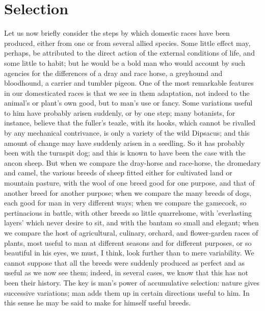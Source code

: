 \section{Selection}
\indent Let us now briefly consider the steps by which domestic races have been produced, either from one or from several allied species. Some little effect may, perhaps, be attributed to the direct action of the external conditions of life, and some little to habit; but he would be a bold man who would account by such agencies for the differences of a dray and race horse, a greyhound and bloodhound, a carrier and tumbler pigeon. One of the most remarkable features in our domesticated races is that we see in them adaptation, not indeed to the animal's or plant's own good, but to man's use or fancy. Some variations useful to him have probably arisen suddenly, or by one step; many botanists, for instance, believe that the fuller's teazle, with its hooks, which cannot be rivalled by any mechanical contrivance, is only a variety of the wild Dipsacus; and this amount of change may have suddenly arisen in a seedling. So it has probably been with the turnspit dog; and this is known to have been the case with the ancon sheep.  But when we compare the dray-horse and race-horse, the dromedary and camel, the various breeds of sheep fitted either for cultivated land or mountain pasture, with the wool of one breed good for one purpose, and that of another breed for another purpose; when we compare the many breeds of dogs, each good for man in very different ways; when we compare the gamecock, so pertinacious in battle, with other breeds so little quarrelsome, with 'everlasting layers' which never desire to sit, and with the bantam so small and elegant; when we compare the host of agricultural, culinary, orchard, and flower-garden races of plants, most useful to man at different seasons and for different purposes, or so beautiful in his eyes, we must, I think, look further than to mere variability. We cannot suppose that all the breeds were suddenly produced as perfect and as useful as we now see them; indeed, in several cases, we know that this has not been their history. The key is man's power of accumulative selection: nature gives successive variations; man adds them up in certain directions useful to him. In this sense he may be said to make for himself useful breeds.  \\
